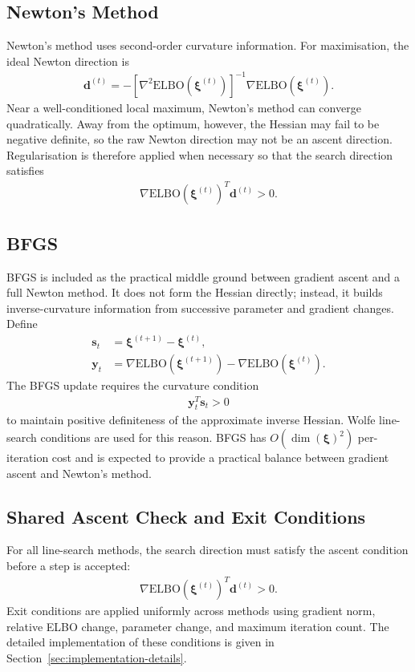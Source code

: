 \documentclass[11pt,a4paper]{article}
\newcommand{\ELBO}{\text{ELBO}}
\begin{document}
\subsection{Newton's Method}

Newton's method uses second-order curvature information. For maximisation, the ideal Newton direction is
\begin{align}
\bm{d}^{(t)} = -[\nabla^2\ELBO(\bm{\xi}^{(t)})]^{-1}\nabla\ELBO(\bm{\xi}^{(t)}).
\end{align}
Near a well-conditioned local maximum, Newton's method can converge quadratically. Away from the optimum, however, the Hessian may fail to be negative definite, so the raw Newton direction may not be an ascent direction. Regularisation is therefore applied when necessary so that the search direction satisfies
\begin{align}
\nabla\ELBO(\bm{\xi}^{(t)})^T\bm{d}^{(t)} > 0.
\end{align}

\subsection{BFGS}

BFGS is included as the practical middle ground between gradient ascent and a full Newton method. It does not form the Hessian directly; instead, it builds inverse-curvature information from successive parameter and gradient changes. Define
\begin{align}
\bm{s}_t &= \bm{\xi}^{(t+1)} - \bm{\xi}^{(t)},\\
\bm{y}_t &= \nabla\ELBO(\bm{\xi}^{(t+1)}) - \nabla\ELBO(\bm{\xi}^{(t)}).
\end{align}
The BFGS update requires the curvature condition
\begin{align}
\bm{y}_t^T\bm{s}_t > 0
\end{align}
to maintain positive definiteness of the approximate inverse Hessian. Wolfe line-search conditions are used for this reason. BFGS has $O(\dim(\bm{\xi})^2)$ per-iteration cost and is expected to provide a practical balance between gradient ascent and Newton's method.

\subsection{Shared Ascent Check and Exit Conditions}

For all line-search methods, the search direction must satisfy the ascent condition before a step is accepted:
\begin{align}
\nabla\ELBO(\bm{\xi}^{(t)})^T\bm{d}^{(t)} > 0.
\end{align}
Exit conditions are applied uniformly across methods using gradient norm, relative ELBO change, parameter change, and maximum iteration count. The detailed implementation of these conditions is given in Section~\ref{sec:implementation-details}.
\end{document}
